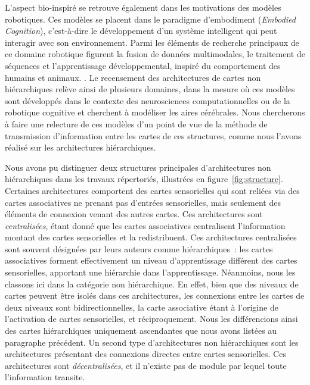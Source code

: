 \documentclass[../main]{subfiles}
\begin{document}
L'aspect bio-inspiré se retrouve également dans les motivations des modèles robotiques. Ces modèles se placent dans le paradigme d'embodiment (\emph{Embodied Cognition}), c'est-à-dire le développement d'un système intelligent qui peut interagir avec son environnement. Parmi les éléments de recherche principaux de ce domaine robotique figurent la fusion de données multimodales, le traitement de séquences et l'apprentissage développemental, inspiré du comportement des humains et animaux. \parencite{Smith2005TheDO}.
Le recensement des architectures de cartes non hiérarchiques relève ainsi de plusieurs domaines, dans la mesure où ces modèles sont développés dans le contexte des neurosciences computationnelles ou de la robotique cognitive et cherchent à modéliser les aires cérébrales. 
Nous chercherons à faire une relecture de ces modèles d'un point de vue de la méthode de transmission d'information entre les cartes de ces structures, comme nous l'avons réalisé sur les architectures hiérarchiques.


Nous avons pu distinguer deux structures principales d'architectures non hiérarchiques dans les travaux répertoriés, illustrées en figure~\ref{fig:structure}.
Certaines architectures comportent des cartes sensorielles qui sont reliées via des cartes associatives ne prenant pas d'entrées sensorielles, mais seulement des éléments de connexion venant des autres cartes. 
Ces architectures sont \emph{centralisées}, étant donné que les cartes associatives centralisent l'information  montant des cartes sensorielles et la redistribuent. Ces architectures centralisées sont souvent désignées par leurs auteurs comme hiérarchiques~: les cartes associatives forment effectivement un niveau d'apprentissage différent des cartes sensorielles, apportant une hiérarchie dans l'apprentissage. 
Néanmoins, nous les classons ici dans la catégorie non hiérarchique. 
En effet, bien que des niveaux de cartes peuvent être isolés dans ces architectures, les connexions entre les cartes de deux niveaux sont bidirectionnelles, la carte associative étant à l'origine de l'activation de cartes sensorielles, et réciproquement.
Nous les différencions ainsi des cartes hiérarchiques uniquement ascendantes que nous avons listées au paragraphe précédent.
Un second type d'architectures non hiérarchiques sont les architectures présentant des connexions directes entre cartes sensorielles. Ces architectures sont \emph{décentralisées}, et il n'existe pas de module par lequel toute l'information transite.
\end{document}
